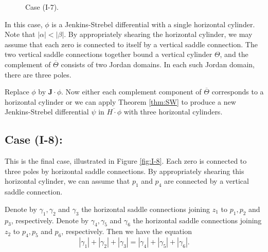 \documentclass[11pt]{amsart}
\theoremstyle{plain}
\newcommand{\rot}{\mathbf{J}}
\begin{document}
\begin{figure}[h]
    \centering
\caption{Case (I-7).}
       \label{fig:I-4}
\end{figure}



In this case,  $\phi$ is a Jenkins-Strebel differential with a single horizontal cylinder. 
Note that $|\alpha| < |\beta|$. By appropriately
shearing the horizontal cylinder, we may assume that each zero is connected  to itself by  a vertical saddle connection. The two vertical saddle connections together bound a vertical cylinder $\Theta$,
and the complement of $\overline{\Theta}$ consists of two Jordan domains.
In each such Jordan domain, there are three poles. 

Replace $\phi$ by $\rot \cdot \phi$. Now either each  complement component of $\overline{\Theta}$ corresponds to a horizontal cylinder 
or we can apply Theorem \ref{thm:SW} to produce a new Jenkins-Strebel differential $\psi$ in $\overline{H\cdot \phi}$ with three horizontal cylinders. 


\subsection*{Case \textbf{(I-8):}} This is the final case, illustrated in Figure \ref{fig:I-8}.
 Each zero is connected to three poles by horizontal saddle connections. 
 By  appropriately shearing this horizontal cylinder, we can assume that 
 $p_1$ and $p_4$ are connected by  a vertical saddle connection.
 
 Denote by $\gamma_1, \gamma_2$ and $\gamma_3$ the horizontal saddle connections joining
 $z_1$ to $p_1, p_2$ and $p_3$, respectively.  Denote by $\gamma_4, \gamma_5$ and $\gamma_6$ the horizontal saddle connections joining
 $z_2$ to $p_4, p_5$ and $p_6$, respectively. 
 Then we have the equation 
 $$|\gamma_1|+|\gamma_2|+|\gamma_3|= |\gamma_4|+|\gamma_5|+|\gamma_6|.$$
 
\end{document}
